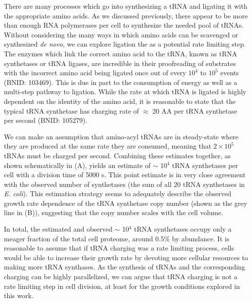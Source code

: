 There are many processes which go into synthesizing a tRNA and ligating it
with the appropriate amino acids. As we discussed previously, there appear to
be more than enough RNA polymerases per cell to synthesize the needed pool of
tRNAs. Without considering the many ways in which amino acids can be
scavenged or synthesized \textit{de novo}, we can explore ligation the as a
potential rate limiting step. The enzymes which link the correct amino acid
to the tRNA, known as tRNA synthetases or tRNA ligases, are incredible in
their proofreading of substrates with the incorrect amino acid being ligated
once out of every $10^4$ to $10^5$ events (BNID: 103469).
This is due in part to the consumption of energy as well as a multi-step
pathway to ligation. While the rate at which tRNA is ligated is highly
dependent on the identity of the amino acid, it is reasonable to state that
the typical tRNA synthetase has charging rate of $\approx$ 20 AA per tRNA
synthetase per second (BNID: 105279).

We can make an assumption that amino-acyl tRNAs are in steady-state where they
are produced at the same rate they are consumed, meaning that $2 \times 10^5$
tRNAs must be charged per second. Combining these estimates together, as shown schematically
in (A), yields an estimate of $\sim$ 10$^4$ tRNA
synthetases per cell with a division time of 5000 s. This point estimate is in
very close agreement with the observed number of synthetases (the sum of all 20
tRNA synthetases in \textit{E. coli}). This estimation strategy seems to
adequately describe the observed growth rate dependence of the tRNA synthetase copy
number (shown as the grey line in (B)), suggesting that
the copy number scales with the cell volume.

In total, the estimated and observed $\sim$ 10$^4$ tRNA synthetases occupy
only a meager fraction of the total cell proteome, around 0.5\% by abundance. It
is reasonable to assume that if tRNA charging was a rate limiting process, cells
would be able to increase their growth rate by devoting more cellular resources
to making more tRNA synthases. As the synthesis of tRNAs and the corresponding
charging can be highly parallelized, we can argue that tRNA charging is not a
rate limiting step in cell division, at least for the growth conditions explored
in this work.

